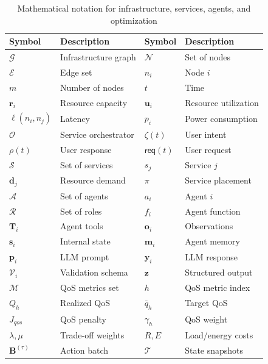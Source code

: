 \begin{table}[!htbp]
\centering
\caption{Mathematical notation for infrastructure, services, agents, and optimization}
\label{tab:ch5_notation}
\small
\renewcommand{\arraystretch}{1.15}
\begin{tabular}{l l | l l}
\toprule
\textbf{Symbol} & \textbf{Description} & \textbf{Symbol} & \textbf{Description} \\
\midrule
\rowcolor{gray!20} $\mathcal{G}$ & Infrastructure graph & $\mathcal{N}$ & Set of nodes \\
$\mathcal{E}$ & Edge set & $n_i$ & Node $i$ \\
\rowcolor{gray!20} $m$ & Number of nodes & $t$ & Time \\
$\mathbf{r}_i$ & Resource capacity & $\mathbf{u}_i$ & Resource utilization \\
\rowcolor{gray!20} $\ell(n_i,n_j)$ & Latency & $p_i$ & Power consumption \\
$\mathcal{O}$ & Service orchestrator & $\zeta(t)$ & User intent \\
\rowcolor{gray!20} $\rho(t)$ & User response & $\mathsf{req}(t)$ & User request \\
\midrule
$\mathcal{S}$ & Set of services & $s_j$ & Service $j$ \\
\rowcolor{gray!20} $\mathbf{d}_j$ & Resource demand & $\pi$ & Service placement \\
\midrule
$\mathcal{A}$ & Set of agents & $a_i$ & Agent $i$ \\
\rowcolor{gray!20} $\mathcal{R}$ & Set of roles & $f_i$ & Agent function \\
$\mathbf{T}_i$ & Agent tools & $\mathbf{o}_i$ & Observations \\
\rowcolor{gray!20} $\mathbf{s}_i$ & Internal state & $\mathbf{m}_i$ & Agent memory \\
$\mathbf{p}_i$ & \ac{LLM} prompt & $\mathbf{y}_i$ & \ac{LLM} response \\
\rowcolor{gray!20} $\mathcal{V}_i$ & Validation schema & $\mathbf{z}$ & Structured output \\
\midrule
\rowcolor{gray!20} $\mathcal{M}$ & \ac{QoS} metrics set & $h$ & \ac{QoS} metric index \\
$Q_h$ & Realized \ac{QoS} & $\bar{q}_h$ & Target \ac{QoS} \\
\rowcolor{gray!20} $J_{qos}$ & \ac{QoS} penalty & $\gamma_h$ & \ac{QoS} weight \\
$\lambda,\mu$ & Trade-off weights & $R,E$ & Load/energy costs \\
\rowcolor{gray!20} $\mathbf{B}^{(\tau)}$ & Action batch & $\mathcal{T}$ & State snapshots \\
\bottomrule
\end{tabular}
\end{table}

